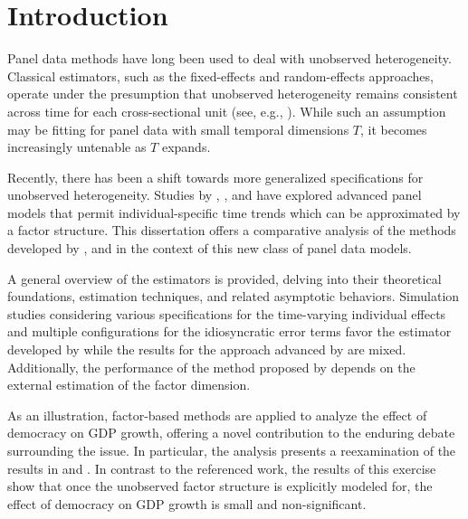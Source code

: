

\setcounter{tocdepth}{2}
\tableofcontents
\clearpage


\pagestyle{fancy}
\fancyhf{}
\fancyhead[C]{\leftmark}
\fancyfoot[C]{\thepage}


\section{Introduction}
\thispagestyle{plainfancy}


Panel data methods have long been used to deal with unobserved heterogeneity. Classical estimators, such as the fixed-effects and random-effects approaches, operate under the presumption that unobserved heterogeneity remains consistent across time for each cross-sectional unit (see, e.g., \citet{arellano2003panel}). While such an assumption may be fitting for panel data with small temporal dimensions $T$, it becomes increasingly untenable as $T$ expands.

Recently, there has been a shift towards more generalized specifications for unobserved heterogeneity. Studies by \citet{bai2008large}, \citet{bai2009panel}, \citet{kneip2012new} and \citet{bada2014parameter}  have explored advanced panel models that permit individual-specific time trends which can be approximated by a factor structure. This dissertation offers a comparative analysis of the methods developed by \citet{bai2009panel}, \citet{kneip2012new} and \citet{bada2014parameter} in the context of this new class of panel data models. 

A general overview of the estimators is provided, delving into their theoretical foundations, estimation techniques, and related asymptotic behaviors. Simulation studies considering various specifications for the time-varying individual effects and multiple configurations for the idiosyncratic error terms favor the estimator developed by \citet{bada2014parameter} while the results for the approach advanced by \citet{kneip2012new} are mixed. Additionally, the performance of the method proposed by \citet{bai2009panel} depends on the external estimation of the factor dimension. 

As an illustration, factor-based methods are applied to analyze the effect of democracy on \ac{GDP} growth, offering a novel contribution to the enduring debate surrounding the issue. In particular, the analysis presents a reexamination of the results in \citet{acemoglu2019democracy} and \citet{chen2019mastering}. In contrast to the referenced work, the results of this exercise show that once the unobserved factor structure is explicitly modeled for, the effect of democracy on \ac{GDP} growth is small and non-significant. 


